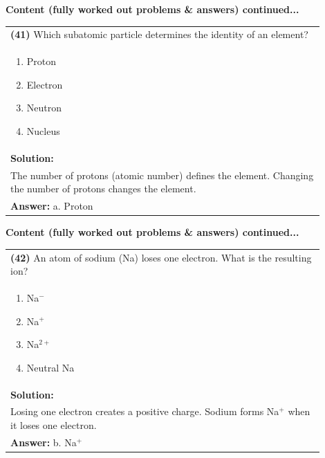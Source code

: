 \documentclass{article}
\begin{document}
\noindent
{\large\textbf{Content (fully worked out problems \& answers) continued...}}\\[0.2em]
\vspace{0.2cm}
\begin{tabular}{|p{0.9\linewidth}|}
\hline
\vspace{0.2cm}
\textbf{(41)} Which subatomic particle determines the identity of an element? \\
\begin{minipage}[t]{0.85\linewidth}
\begin{enumerate}[label=\alph*.]
\item Proton \
\item Electron \
\item Neutron \
\item Nucleus \
\end{enumerate}
\end{minipage}\\
\hline
\vspace{0.2cm}
\textbf{Solution:} \\
The number of protons (atomic number) defines the element. Changing the number of protons changes the element. \\
\hline
\vspace{0.2cm}
\textbf{Answer:} a. Proton \\
\hline
\end{tabular}
\newpage

\noindent
{\large\textbf{Content (fully worked out problems \& answers) continued...}}\\[0.2em]
\vspace{0.2cm}
\begin{tabular}{|p{0.9\linewidth}|}
\hline
\vspace{0.2cm}
\textbf{(42)} An atom of sodium (Na) loses one electron. What is the resulting ion? \\
\begin{minipage}[t]{0.85\linewidth}
\begin{enumerate}[label=\alph*.]
\item Na$^-$ \
\item Na$^{+}$ \
\item Na$^{2+}$ \
\item Neutral Na
\end{enumerate}
\end{minipage}\\
\hline
\vspace{0.2cm}
\textbf{Solution:} \\
Losing one electron creates a positive charge. Sodium forms Na$^{+}$ when it loses one electron. \\
\hline
\vspace{0.2cm}
\textbf{Answer:} b. Na$^{+}$ \\
\hline
\end{tabular}
\newpage
\end{document}

